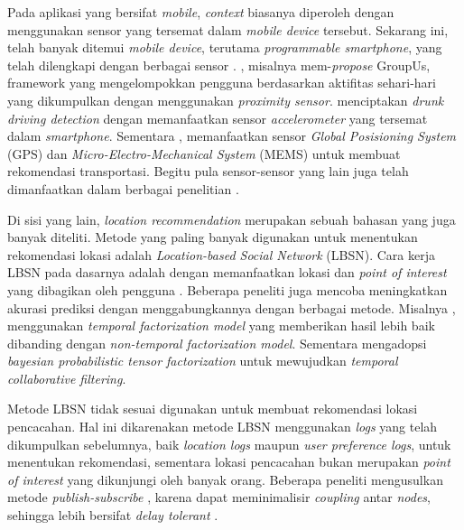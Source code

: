 Pada aplikasi yang bersifat \textit{mobile}, \textit{context} biasanya diperoleh dengan menggunakan sensor yang tersemat dalam \textit{mobile device} tersebut. Sekarang ini, telah banyak ditemui \textit{mobile device}, terutama \textit{programmable smartphone}, yang telah dilengkapi dengan berbagai sensor \citep{cao_mobile_2015}. \citep{do_groupus:_2011}, misalnya mem-\textit{propose} GroupUs, framework yang mengelompokkan pengguna berdasarkan aktifitas sehari-hari yang dikumpulkan dengan menggunakan \textit{proximity sensor}. \citep{dai_mobile_2010} menciptakan \textit{drunk driving detection} dengan memanfaatkan sensor \textit{accelerometer} yang tersemat dalam \textit{smartphone}. Sementara \citep{zou_context-aware_2016}, memanfaatkan sensor \textit{Global Posisioning System} (GPS) dan \textit{Micro-Electro-Mechanical System} (MEMS) untuk membuat rekomendasi transportasi. Begitu pula sensor-sensor yang lain juga telah dimanfaatkan dalam berbagai penelitian \citep{dai_perfalld:_2010, lu_soundsense:_2009, bao_movi:_2010, rubel_toward_2005, atzmueller_towards_2013}.


Di sisi yang lain, \textit{location recommendation} merupakan sebuah bahasan yang juga banyak diteliti. Metode yang paling banyak digunakan untuk menentukan rekomendasi lokasi adalah \textit{Location-based Social Network} (LBSN). Cara kerja LBSN pada dasarnya adalah dengan memanfaatkan lokasi dan \textit{point of interest} yang dibagikan oleh pengguna \citep{yuan_location_2016}. Beberapa peneliti juga mencoba meningkatkan akurasi prediksi dengan menggabungkannya dengan berbagai metode. Misalnya \citep{koren_collaborative_2010}, menggunakan \textit{temporal factorization model} yang memberikan hasil lebih baik dibanding dengan \textit{non-temporal factorization model}. Sementara  \citep{pragarauskas_temporal_2010} mengadopsi \textit{bayesian probabilistic tensor factorization} untuk mewujudkan \textit{temporal collaborative filtering}.


Metode LBSN tidak sesuai digunakan untuk membuat rekomendasi lokasi pencacahan. Hal ini dikarenakan metode LBSN menggunakan \textit{logs} yang telah dikumpulkan sebelumnya, baik \textit{location logs} maupun \textit{user preference logs}, untuk menentukan rekomendasi, sementara lokasi pencacahan bukan merupakan \textit{point of interest} yang dikunjungi oleh banyak orang. Beberapa peneliti mengusulkan metode \textit{publish-subscribe} \citep{chen_efficient_2003, frey_context-aware_2007, costa_socially-aware_2008, bader_context-aware_2012}, karena dapat meminimalisir \textit{coupling} antar \textit{nodes}, sehingga lebih bersifat \textit{delay tolerant} \citep{costa_socially-aware_2008}.


